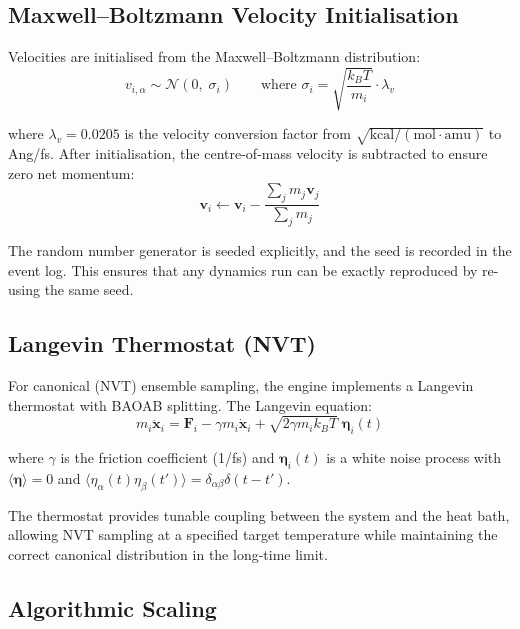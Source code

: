 \documentclass[11pt,twoside]{article}
\def\AA{Ang}%
\begin{document}
\subsection{Maxwell--Boltzmann Velocity Initialisation}

Velocities are initialised from the Maxwell--Boltzmann distribution:
\begin{equation}
  v_{i,\alpha} \sim \mathcal{N}\!\left(0,\; \sigma_i\right) \qquad \text{where } \sigma_i = \sqrt{\frac{k_B T}{m_i}} \cdot \lambda_v
  \label{eq:MB}
\end{equation}

where $\lambda_v = 0.0205$ is the velocity conversion factor from $\sqrt{\mathrm{kcal}/(\mathrm{mol}\cdot\mathrm{amu})}$ to \AA/fs. After initialisation, the centre-of-mass velocity is subtracted to ensure zero net momentum:
\begin{equation}
  \mathbf{v}_i \leftarrow \mathbf{v}_i - \frac{\sum_j m_j \mathbf{v}_j}{\sum_j m_j}
  \label{eq:com-removal}
\end{equation}

The random number generator is seeded explicitly, and the seed is recorded in the event log. This ensures that any dynamics run can be exactly reproduced by re-using the same seed.

\subsection{Langevin Thermostat (NVT)}

For canonical (NVT) ensemble sampling, the engine implements a Langevin thermostat with BAOAB splitting. The Langevin equation:
\begin{equation}
  m_i \ddot{\mathbf{x}}_i = \mathbf{F}_i - \gamma m_i \dot{\mathbf{x}}_i + \sqrt{2\gamma m_i k_B T}\; \boldsymbol{\eta}_i(t)
  \label{eq:langevin}
\end{equation}

where $\gamma$ is the friction coefficient (1/fs) and $\boldsymbol{\eta}_i(t)$ is a white noise process with $\langle\boldsymbol{\eta}\rangle = 0$ and $\langle\eta_\alpha(t)\eta_\beta(t')\rangle = \delta_{\alpha\beta}\delta(t-t')$.

The thermostat provides tunable coupling between the system and the heat bath, allowing NVT sampling at a specified target temperature while maintaining the correct canonical distribution in the long-time limit.

\subsection{Algorithmic Scaling}
\end{document}
